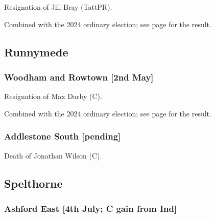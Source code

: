 \documentclass[a4paper,openany]{book}
\begin{document}
\begin{resultsiii}

Resignation of Jill Bray (TattPR).

Combined with the 2024 ordinary election; see page \pageref{ReigateBansteadTattenhamCornerPreston} for the result.

\subsection*{Runnymede}

\subsubsection*{Woodham and Rowtown \hspace*{\fill}\nolinebreak[1]%
	\enspace\hspace*{\fill}
	[2nd May]}


Resignation of Max Darby (C).

Combined with the 2024 ordinary election; see page \pageref{RunnymedeWoodhamRowtown} for the result.

\subsubsection*{Addlestone South \hspace*{\fill}\nolinebreak[1]%
	\enspace\hspace*{\fill}
	[pending]}


Death of Jonathan Wilson (C).

\subsection*{Spelthorne}

\subsubsection*{Ashford East \hspace*{\fill}\nolinebreak[1]%
	\enspace\hspace*{\fill}
	[4th July; C gain from Ind]}



\end{resultsiii}
\end{document}
